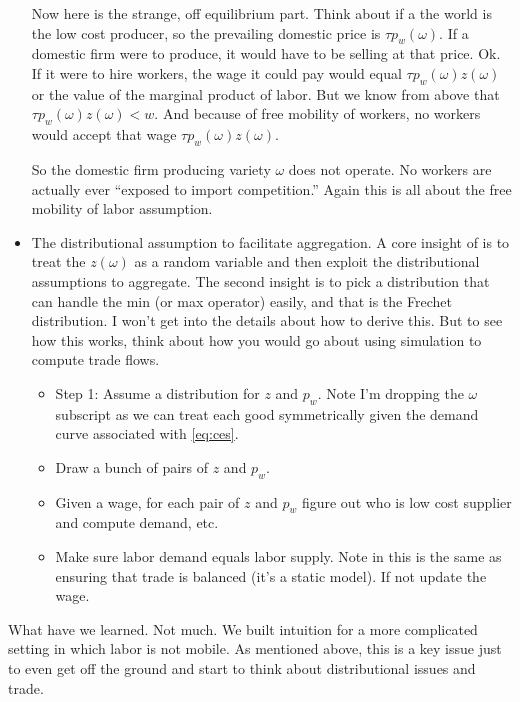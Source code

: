 \documentclass[pdftex,12pt]{article}
\begin{document}
\begin{itemize}
    Now here is the strange, off equilibrium part. Think about if a the world is the low cost producer, so the prevailing domestic price is $\tau p_w(\omega)$. If a domestic firm were to produce, it would have to be selling at that price. Ok. If it were to hire workers, the wage it could pay would equal $\tau p_w(\omega) z(\omega)$ or the value of the marginal product of labor. But we know from above that 
$\tau p_w(\omega) z(\omega) < w$. And because of free mobility of workers, no workers would accept that wage $\tau p_w(\omega) z(\omega)$. 

So the domestic firm producing variety $\omega$ does not operate. No workers are actually ever ``exposed to import competition.'' Again this is all about the free mobility of labor assumption.

\item The distributional assumption to facilitate aggregation. A core insight of \citet{eaton2002technology} is to treat the $z(\omega)$ as a random variable and then exploit the distributional assumptions to aggregate. The second insight is to pick a distribution that can handle the min (or max operator) easily, and that is the Frechet distribution. I won't get into the details about how to derive this. But to see how this works, think about how you would go about using simulation to compute trade flows.
\begin{itemize}
\item Step 1: Assume a distribution for $z$ and $p_w$. Note I'm dropping the $\omega$ subscript as we can treat each good symmetrically given the demand curve associated with \ref{eq:ces}.

\item Draw a bunch of pairs of $z$ and $p_w$. 

\item Given a wage, for each pair of $z$ and $p_w$ figure out who is low cost supplier and compute demand, etc.

\item Make sure labor demand equals labor supply. Note in this is the same as ensuring that trade is balanced (it's a static model). If not update the wage.
\end{itemize}
\end{itemize}
What have we learned. Not much. We built intuition for a more complicated setting in which labor is not mobile. As mentioned above, this is a key issue just to even get off the ground and start to think about distributional issues and trade. 
\end{document}
